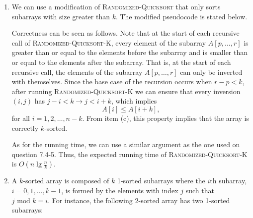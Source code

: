 \documentclass{report}
\makeatletter
\renewenvironment{framed}{%
 \def\FrameCommand##1{\hskip\@totalleftmargin
 \fboxsep=\FrameSep\fbox{##1}}%
 \MakeFramed {\advance\hsize-\width
   \@totalleftmargin\z@ \linewidth\hsize
   \@setminipage}}%
 {\par\unskip\endMakeFramed}
\let\oldnl\nl%
\newcommand{\nonl}{\renewcommand{\nl}{\let\nl\oldnl}}%
\makeatother
\begin{document}
\begin{enumerate}
\begin{framed}
\begin{enumerate}
\item We can use a modification of \textsc{Randomized-Quicksort} that only sorts
subarrays with size greater than $k$. The modified pseudocode is stated below.

\begin{algorithm}[H]
\SetAlgoNoEnd\DontPrintSemicolon
\BlankLine
{}
\nonl{}
\end{algorithm}

Correctness can be seen as follows. Note that at the start of each recursive
call of \textsc{Randomized-Quicksort-K}, every element of the subarray
$A[p, \dots, r]$ is greater than or equal to the elements before the subarray
and is smaller than or equal to the elements after the subarray. That is, at the
start of each recursive call, the elements of the subarray $A[p, \dots, r]$
can only be inverted with themselves. Since the base case of the recursion
occurs when $r - p < k$, after running \textsc{Randomized-Quicksort-K} we can
ensure that every inversion $(i, j)$ has $j - i < k \rightarrow j < i + k$,
which implies
\[
  A[i] \le A[i + k],
\]
for all $i = 1, 2, \dots, n - k$. From item (c), this property implies that the
array is correctly $k$-sorted.

As for the running time, we can use a similar argument as the one used on
question 7.4-5. Thus, the expected running time of
\textsc{Randomized-Quicksort-K} is $O\left(n \lg \frac{n}{k}\right)$.

\item A $k$-sorted array is composed of $k$ 1-sorted subarrays where the $i$th
subarray, $i = 0, 1, \dots, k - 1$, is formed by the elements with index $j$
such that $j \text{ mod } k = i$. For instance, the following $2$-sorted array
has two 1-sorted subarrays:
\begin{center}
\end{center}


\end{enumerate}
\end{framed}
\end{enumerate}
\end{document}
